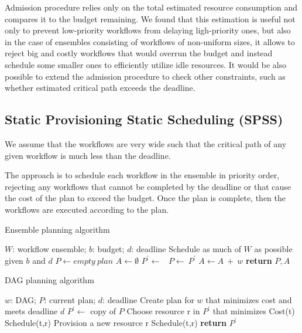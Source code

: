 \documentclass{sig-alternate}
\begin{document}
Admission procedure relies only on the total estimated resource consumption and
compares it to the budget remaining. We found that this estimation is useful not
only to prevent low-priority workflows from delaying ligh-priority ones, but
also in the case of ensembles consisting of workflows of non-uniform sizes, it
allows to reject big and costly workflows that would overrun the budget and
instead schedule some smaller ones to efficiently utilize idle resources. It
would be also possible to extend the admission procedure to check other
constraints, such as whether estimated critical path exceeds the deadline.



\subsection{Static Provisioning Static Scheduling (SPSS)}

We assume that the workflows are very wide such that the critical path of any given workflow is much less than the deadline.

The approach is to schedule each workflow in the ensemble in priority order, rejecting any workflows that cannot be completed by the deadline or that cause the cost of the plan to exceed the budget. Once the plan is complete, then the workflows are executed according to the plan.

\begin{algorithm}
\caption{Ensemble planning algorithm}
\label{alg:admit}
\begin{algorithmic}[1]
\Require $W$: workflow ensemble; $b$: budget; $d$: deadline
\Ensure Schedule as much of $W$ as possible given $b$ and $d$
    \State $P\gets empty\ plan$
    \State $A\gets \emptyset$ 
        \State $P^\prime \gets$\ 
                \State $P\gets\ P^\prime$ 
                \State $A \gets A\ +\ w$ 
            \EndIf
        \EndIf
    \EndFor
    \State \textbf{return} $P,A$
\EndProcedure
\end{algorithmic} 
\end{algorithm}


\begin{algorithm}
\caption{DAG planning algorithm}
\label{alg:plandag}
\begin{algorithmic}[1]
\Require $w$: DAG; $P$: current plan; $d$: deadline
\Ensure Create plan for $w$ that minimizes cost and meets deadline $d$
    \State $P^\prime\gets$ copy of $P$
    \State {}
        \State Choose resource r in $P^\prime$ that minimizes Cost(t)
            \State Schedule(t,r)
        \Else
            \State Provision a new resource r
            \State Schedule(t,r)
        \EndIf
    \EndFor
    \State \textbf{return} $P^\prime$
\EndProcedure
\end{algorithmic} 
\end{algorithm}
\end{document}

